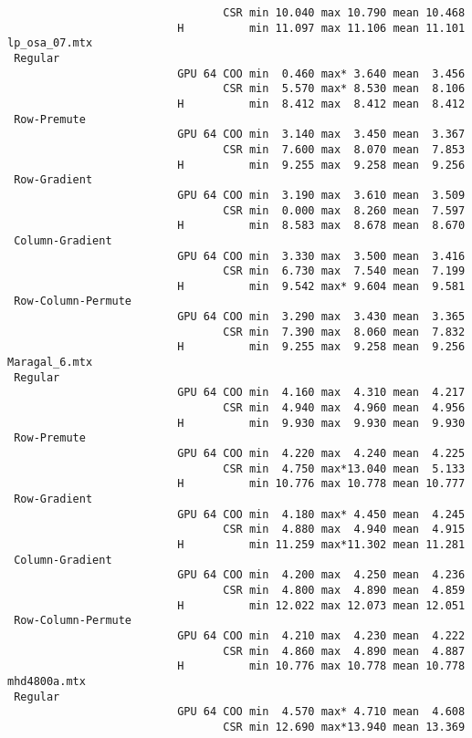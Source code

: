 {\begin{verbatim}
                                 CSR min 10.040 max 10.790 mean 10.468
                          H          min 11.097 max 11.106 mean 11.101
lp_osa_07.mtx
 Regular
                          GPU 64 COO min  0.460 max* 3.640 mean  3.456
                                 CSR min  5.570 max* 8.530 mean  8.106
                          H          min  8.412 max  8.412 mean  8.412
 Row-Premute
                          GPU 64 COO min  3.140 max  3.450 mean  3.367
                                 CSR min  7.600 max  8.070 mean  7.853
                          H          min  9.255 max  9.258 mean  9.256
 Row-Gradient
                          GPU 64 COO min  3.190 max  3.610 mean  3.509
                                 CSR min  0.000 max  8.260 mean  7.597
                          H          min  8.583 max  8.678 mean  8.670
 Column-Gradient
                          GPU 64 COO min  3.330 max  3.500 mean  3.416
                                 CSR min  6.730 max  7.540 mean  7.199
                          H          min  9.542 max* 9.604 mean  9.581
 Row-Column-Permute
                          GPU 64 COO min  3.290 max  3.430 mean  3.365
                                 CSR min  7.390 max  8.060 mean  7.832
                          H          min  9.255 max  9.258 mean  9.256
Maragal_6.mtx
 Regular
                          GPU 64 COO min  4.160 max  4.310 mean  4.217
                                 CSR min  4.940 max  4.960 mean  4.956
                          H          min  9.930 max  9.930 mean  9.930
 Row-Premute
                          GPU 64 COO min  4.220 max  4.240 mean  4.225
                                 CSR min  4.750 max*13.040 mean  5.133
                          H          min 10.776 max 10.778 mean 10.777
 Row-Gradient
                          GPU 64 COO min  4.180 max* 4.450 mean  4.245
                                 CSR min  4.880 max  4.940 mean  4.915
                          H          min 11.259 max*11.302 mean 11.281
 Column-Gradient
                          GPU 64 COO min  4.200 max  4.250 mean  4.236
                                 CSR min  4.800 max  4.890 mean  4.859
                          H          min 12.022 max 12.073 mean 12.051
 Row-Column-Permute
                          GPU 64 COO min  4.210 max  4.230 mean  4.222
                                 CSR min  4.860 max  4.890 mean  4.887
                          H          min 10.776 max 10.778 mean 10.778
mhd4800a.mtx
 Regular
                          GPU 64 COO min  4.570 max* 4.710 mean  4.608
                                 CSR min 12.690 max*13.940 mean 13.369

\end{verbatim}}
